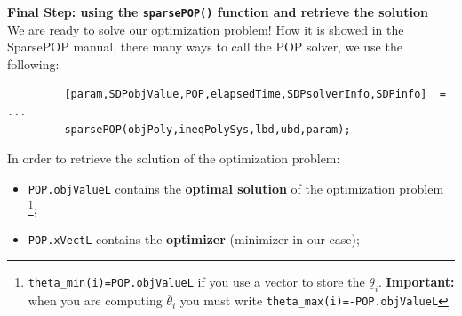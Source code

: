 \noindent
\textbf{Final Step: using the \texttt{sparsePOP()} function and retrieve the solution}\\
We are ready to solve our optimization problem! How it is showed in the SparsePOP manual, there many ways to call the POP solver, we use the following:
{\normalsize{
    \color{blue}
    \begin{verbatim}
         [param,SDPobjValue,POP,elapsedTime,SDPsolverInfo,SDPinfo]  = ... 
         sparsePOP(objPoly,ineqPolySys,lbd,ubd,param); 
    \end{verbatim}
}}
\noindent
In order to retrieve the solution of the optimization problem:
\begin{itemize}
    \itemsep0em
    \item \texttt{POP.objValueL} contains the \textbf{optimal solution} of the optimization problem
    \footnote[5]{\texttt{theta\_min(i)=POP.objValueL} if you use a vector to store the $\underline{\theta}_i$. \textbf{Important: } when you are computing $\overline{\theta}_i$ you must write \texttt{theta\_max(i)=-POP.objValueL}};
    \item \texttt{POP.xVectL} contains the \textbf{optimizer} (minimizer in our case); 
\end{itemize}




 







